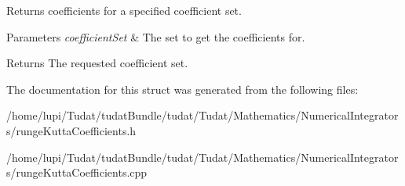 Returns coefficients for a specified coefficient set. 
\begin{DoxyParams}{Parameters}
{\em coefficient\+Set} & The set to get the coefficients for. \\
\hline
\end{DoxyParams}
\begin{DoxyReturn}{Returns}
The requested coefficient set. 
\end{DoxyReturn}


The documentation for this struct was generated from the following files\+:\begin{DoxyCompactItemize}
\item 
/home/lupi/\+Tudat/tudat\+Bundle/tudat/\+Tudat/\+Mathematics/\+Numerical\+Integrators/runge\+Kutta\+Coefficients.\+h\item 
/home/lupi/\+Tudat/tudat\+Bundle/tudat/\+Tudat/\+Mathematics/\+Numerical\+Integrators/runge\+Kutta\+Coefficients.\+cpp\end{DoxyCompactItemize}
